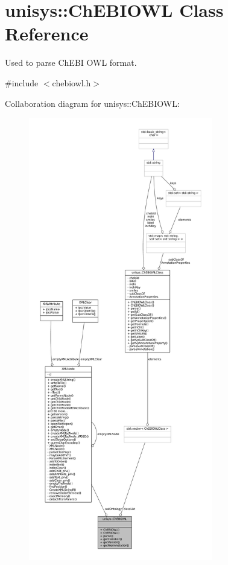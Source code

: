 \hypertarget{classunisys_1_1ChEBIOWL}{\section{unisys\-:\-:Ch\-E\-B\-I\-O\-W\-L Class Reference}
\label{classunisys_1_1ChEBIOWL}
}


Used to parse Ch\-E\-B\-I O\-W\-L format.  




{\ttfamily \#include $<$chebiowl.\-h$>$}



Collaboration diagram for unisys\-:\-:Ch\-E\-B\-I\-O\-W\-L\-:
\nopagebreak
\begin{figure}[H]
\begin{center}
\leavevmode
\includegraphics[height=550pt]{classunisys_1_1ChEBIOWL__coll__graph}
\end{center}
\end{figure}
